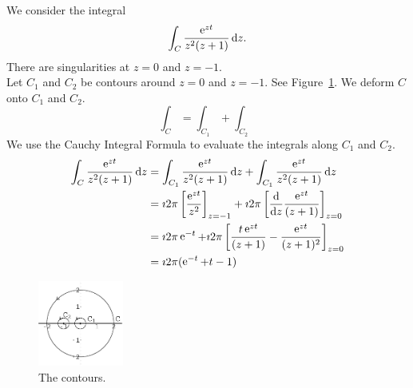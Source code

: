 {\begin{Solution}
\begin{enumerate}
    We consider the integral
    \[
    \int_C \frac{\mathop{\mathrm{e}}\nolimits^{z t}}{z^2 (z + 1)}\,\mathrm{d} z.
    \]
    There are singularities at $z = 0$ and $z = - 1$.
    \[
    \]
    Let $C_1$ and $C_2$ be contours around $z = 0$ and $z = - 1$.  See 
    Figure~\ref{figure ezt-z2z1}.  We deform $C$ onto $C_1$ and $C_2$.
    \[
    \int_{C} = \int_{C_1} + \int_{C_2}
    \]
    We use the Cauchy Integral Formula to evaluate the integrals along
    $C_1$ and $C_2$.
    \begin{align*}
      \int_C \frac{\mathop{\mathrm{e}}\nolimits^{z t}}{z^2 (z + 1)}\,\mathrm{d} z
      &= \int_{C_1} \frac{\mathop{\mathrm{e}}\nolimits^{z t}}{z^2 (z + 1)}\,\mathrm{d} z
      + \int_{C_1} \frac{\mathop{\mathrm{e}}\nolimits^{z t}}{z^2 (z + 1)}\,\mathrm{d} z
      \\
      &= \imath 2 \pi \left[ \frac{\mathop{\mathrm{e}}\nolimits^{z t}}{z^2} \right]_{z = -1}
      + \imath 2 \pi \left[ \frac{\mathrm{d}}{\mathrm{d} z} \frac{\mathop{\mathrm{e}}\nolimits^{z t}}{(z + 1)} \right]_{z = 0}
      \\
      &= \imath 2 \pi \mathop{\mathrm{e}}\nolimits^{-t}
      + \imath 2 \pi \left[ \frac{t \mathop{\mathrm{e}}\nolimits^{z t}}{(z + 1)} - \frac{\mathop{\mathrm{e}}\nolimits^{z t}}{(z + 1)^2} 
      \right]_{z = 0}
      \\
      &= \imath 2 \pi (\mathop{\mathrm{e}}\nolimits^{-t} + t - 1)
    \end{align*}
    \begin{figure}[htb!]
      \begin{center}
        \includegraphics[width=0.25\textwidth]{fcv/cauchy/ezt-z2z1}
      \end{center}
      \caption{The contours.}
      \label{figure ezt-z2z1}
    \end{figure}
  \end{enumerate}
\end{Solution}







}
